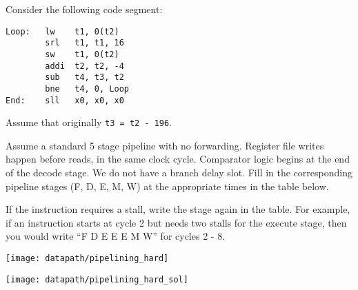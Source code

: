 \begin{blocksection}
\question
Consider the following code segment:
\begin{verbatim}
Loop:	lw    t1, 0(t2)
		srl   t1, t1, 16
		sw    t1, 0(t2)
		addi  t2, t2, -4
		sub	  t4, t3, t2
		bne   t4, 0, Loop
End: 	sll   x0, x0, x0
\end{verbatim}
Assume that originally \texttt{t3 = t2 - 196}.

Assume a standard 5 stage pipeline with no forwarding. Register file writes happen before reads, in the same clock cycle. Comparator logic begins at the end of the decode stage. We do not have a branch delay slot. Fill in the corresponding pipeline stages (F, D, E, M, W) at the appropriate times in the table below. 

If the instruction requires a stall, write the stage again in the table. For example, if an instruction starts at cycle 2 but needs two stalls for the execute stage, then you would write “F D E E E M W” for cycles 2 - 8. 

\texttt{[image: datapath/pipelining\_hard]}

\begin{solution}
\texttt{[image: datapath/pipelining\_hard\_sol]}
\end{solution}

\end{blocksection}